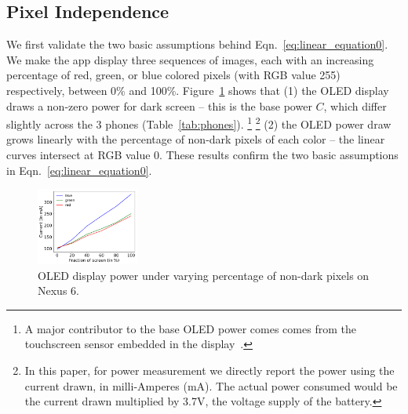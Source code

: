 
\subsection{Pixel Independence}
\label{subsec:basic}

We first validate the two basic assumptions behind
Eqn.~\ref{eq:linear_equation0}.  We make the app display three sequences of
images, each with an increasing percentage of red, green, or blue colored
pixels (with RGB value 255)
respectively, between 0\% and 100\%.  Figure~\ref{fig:basic} shows that (1)
the OLED display draws a non-zero power for dark screen -- this is the
base power $C$, which differ slightly across the 3 phones (Table~\ref{tab:phones}).
\footnote{A major contributor to the base OLED power comes
comes from the touchscreen sensor embedded in the
display~\cite{touchscreenpower}.}
\footnote{In this paper, for power
  measurement we directly report the power using the current drawn, in
  milli-Amperes (mA).  The actual power consumed would be the current
  drawn multiplied by 3.7V, the voltage supply of the battery.}
%
(2) the OLED power draw grows linearly with the percentage
of non-dark pixels of each color -- the
linear curves intersect at RGB value 0.
These results confirm the two
basic assumptions in Eqn.~\ref{eq:linear_equation0}.


\begin{figure}[tp]
        \vspace{-0.1in}
        \includegraphics[width=0.30\textwidth]{./figure/1501_Vertical.pdf}
        \vspace{-0.1in}
	\caption{OLED display power under varying percentage of non-dark pixels on Nexus 6.}
        \vspace{-0.1in}
        \label{fig:basic}
\end{figure}

